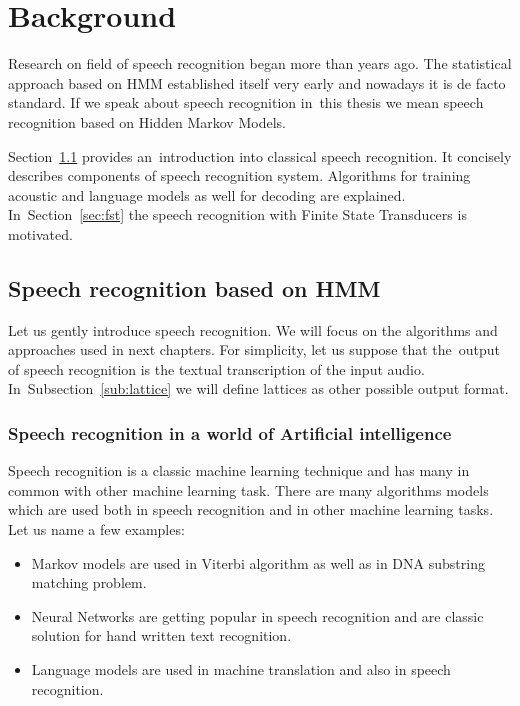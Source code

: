 \chapter{Background}
\label{cha:background}

% 
% 

Research on field of speech recognition began more than  years ago. The statistical approach based on \ac{HMM} established itself very early and nowadays it is de facto standard. If we speak about speech recognition in~this thesis we mean speech recognition based on Hidden Markov Models. 

Section~\ref{sec:general_introduction} provides an~introduction into classical speech recognition. It concisely describes components of speech recognition system. Algorithms for training acoustic and language models as well for decoding are explained. In~Section~\ref{sec:fst} the speech recognition with Finite State Transducers is motivated.

\section{Speech recognition based on \ac{HMM}} 
\label{sec:general_introduction}
Let us gently introduce speech recognition. We will focus on the algorithms and approaches used in next chapters. For simplicity,
let us suppose that the~output of speech recognition is the textual transcription of the input audio. In~Subsection~\ref{sub:lattice} we will define
lattices as other possible output format.

\subsection*{Speech recognition in a world of Artificial intelligence}
\label{sub:intro_ml}
Speech recognition is a classic machine learning technique and has many in common with other machine learning task. There are many algorithms models which are used both in speech recognition and in other machine learning tasks.
Let us name a few examples:
\begin{itemize}
    \item Markov models are used in Viterbi algorithm as well as in \ac{DNA} substring matching problem.
    \item Neural Networks are getting popular in speech recognition and are classic solution for hand written text recognition.
    \item Language models are used in machine translation and also in speech recognition. 
\end{itemize}

